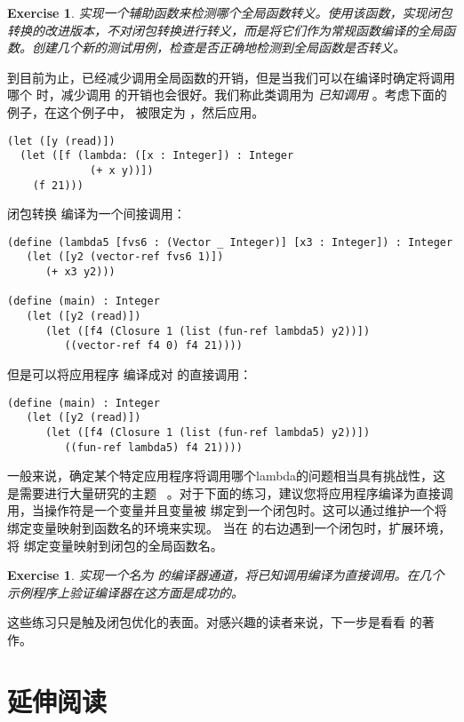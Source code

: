 \documentclass[11pt]{book}
\newtheorem{exercise}[theorem]{Exercise}
\begin{document}
\begin{exercise}\normalfont
 实现一个辅助函数来检测哪个全局函数转义。使用该函数，实现闭包转换的改进版本，不对闭包转换进行转义，而是将它们作为常规函数编译的全局函数。创建几个新的测试用例，检查是否正确地检测到全局函数是否转义。
\end{exercise}

到目前为止，已经减少调用全局函数的开销，但是当我们可以在编译时确定将调用哪个
 时，减少调用
 的开销也会很好。我们称此类调用为 \emph{已知调用} 。考虑下面的例子，在这个例子中，  被限定为  ，然后应用。
\begin{lstlisting}
(let ([y (read)])
  (let ([f (lambda: ([x : Integer]) : Integer
             (+ x y))])
    (f 21)))
\end{lstlisting}
闭包转换  编译为一个间接调用：
\begin{lstlisting}
(define (lambda5 [fvs6 : (Vector _ Integer)] [x3 : Integer]) : Integer
   (let ([y2 (vector-ref fvs6 1)])
      (+ x3 y2)))

(define (main) : Integer
   (let ([y2 (read)])
      (let ([f4 (Closure 1 (list (fun-ref lambda5) y2))])
         ((vector-ref f4 0) f4 21))))
\end{lstlisting}
但是可以将应用程序  编译成对  的直接调用：
\begin{lstlisting}
(define (main) : Integer
   (let ([y2 (read)])
      (let ([f4 (Closure 1 (list (fun-ref lambda5) y2))])
         ((fun-ref lambda5) f4 21))))
\end{lstlisting}

一般来说，确定某个特定应用程序将调用哪个lambda的问题相当具有挑战性，这是需要进行大量研究的主题~\citep{Shivers:1988aa,Gilray:2016aa} 。对于下面的练习，建议您将应用程序编译为直接调用，当操作符是一个变量并且变量被
 绑定到一个闭包时。这可以通过维护一个将  绑定变量映射到函数名的环境来实现。
当在  的右边遇到一个闭包时，扩展环境，将  绑定变量映射到闭包的全局函数名。

\begin{exercise}\normalfont
实现一个名为  的编译器通道，将已知调用编译为直接调用。在几个示例程序上验证编译器在这方面是成功的。
\end{exercise}

这些练习只是触及闭包优化的表面。对感兴趣的读者来说，下一步是看看 \citet{Keep:2012ab} 的著作。

\section{延伸阅读}
\end{document}

